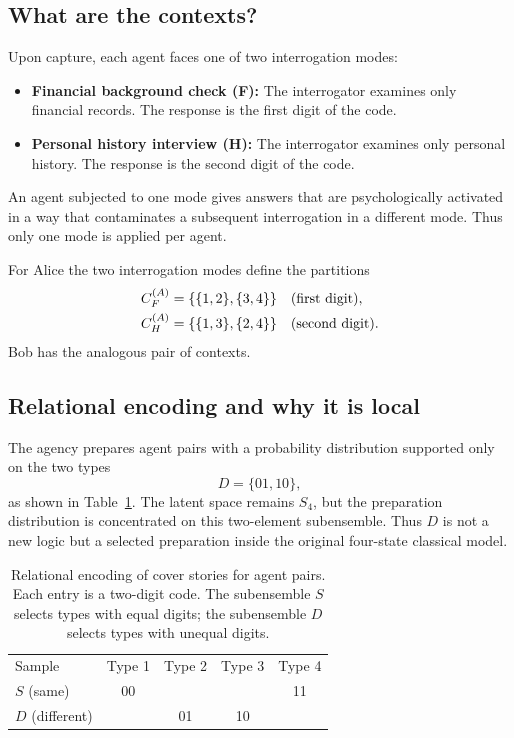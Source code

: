 \documentclass[aps,pra,twocolumn,superscriptaddress,floatfix,longbibliography]{revtex4-2}
\begin{document}
\subsection{What are the contexts?}

Upon capture, each agent faces one of two interrogation modes:
\begin{itemize}
\item \textbf{Financial background check (F):} The interrogator
examines only financial records. The response is the first digit of
the code.
\item \textbf{Personal history interview (H):} The interrogator
examines only personal history. The response is the second digit of
the code.
\end{itemize}
An agent subjected to one mode gives answers that are psychologically
activated in a way that contaminates a subsequent interrogation in a
different mode. Thus only one mode is applied per agent.

For Alice the two interrogation modes define the partitions
\begin{align}
C_F^{(A)} &= \{\{1,2\},\{3,4\}\}
\quad\text{(first digit)}, \notag\\
C_H^{(A)} &= \{\{1,3\},\{2,4\}\}
\quad\text{(second digit)}.
\label{eq:alice}
\end{align}
Bob has the analogous pair of contexts.

\subsection{Relational encoding and why it is local}

The agency prepares agent pairs with a probability distribution
supported only on the two types
\[
D=\{01,10\},
\]
as shown in Table~\ref{tab:relational}. The latent space remains
$S_4$, but the preparation distribution is concentrated on this
two-element subensemble. Thus $D$ is not a new logic but a selected
preparation inside the original four-state classical model.

\begin{table}[b]
\caption{\label{tab:relational}Relational encoding of cover
stories for agent pairs. Each entry is a two-digit code. The
subensemble $S$ selects types with equal digits; the subensemble
$D$ selects types with unequal digits.}
\begin{ruledtabular}
\begin{tabular}{lcccc}
Sample & Type 1 & Type 2 & Type 3 & Type 4\\
\colrule
$S$ (same)  & 00 &    &    & 11 \\
$D$ (different) &    & 01 & 10 &    \\
\end{tabular}
\end{ruledtabular}
\end{table}
\end{document}
